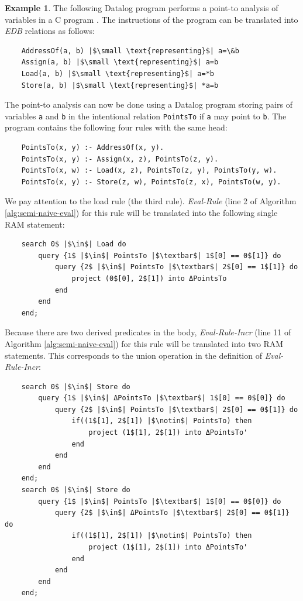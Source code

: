\documentclass[twoside,11pt,openright]{report}
\theoremstyle{definition}
\newtheorem{exmp}{Example}[chapter]
\begin{document}
\begin{exmp}
  The following Datalog program performs a point-to analysis of variables in a C program \cite{PGL-014}. The instructions of the program can be translated into \textit{EDB} relations as follows:
  \begin{verbatim}
    AddressOf(a, b) |$\small \text{representing}$| a=\&b
    Assign(a, b) |$\small \text{representing}$| a=b
    Load(a, b) |$\small \text{representing}$| a=*b
    Store(a, b) |$\small \text{representing}$| *a=b
  \end{verbatim}
  The point-to analysis can now be done using a Datalog program storing pairs of variables \texttt{a} and \texttt{b} in the intentional relation \texttt{PointsTo} if \texttt{a} may point to \texttt{b}. The program contains the following four rules with the same head:
  \begin{verbatim}
    PointsTo(x, y) :- AddressOf(x, y).
    PointsTo(x, y) :- Assign(x, z), PointsTo(z, y).
    PointsTo(x, w) :- Load(x, z), PointsTo(z, y), PointsTo(y, w).
    PointsTo(x, y) :- Store(z, w), PointsTo(z, x), PointsTo(w, y).
  \end{verbatim}
  We pay attention to the load rule (the third rule). \textit{Eval-Rule} (line 2 of Algorithm \ref{alg:semi-naive-eval}) for this rule will be translated into the following single RAM statement:
  \begin{verbatim}
    search 0$ |$\in$| Load do
        query {1$ |$\in$| PointsTo |$\textbar$| 1$[0] == 0$[1]} do
            query {2$ |$\in$| PointsTo |$\textbar$| 2$[0] == 1$[1]} do
                project (0$[0], 2$[1]) into ΔPointsTo
            end
        end
    end;
  \end{verbatim}
  Because there are two derived predicates in the body, \textit{Eval-Rule-Incr} (line 11 of Algorithm \ref{alg:semi-naive-eval}) for this rule will be translated into two RAM statements. This corresponds to the union operation in the definition of \textit{Eval-Rule-Incr}:
  \begin{verbatim}
    search 0$ |$\in$| Store do
        query {1$ |$\in$| ΔPointsTo |$\textbar$| 1$[0] == 0$[0]} do
            query {2$ |$\in$| PointsTo |$\textbar$| 2$[0] == 0$[1]} do
                if((1$[1], 2$[1]) |$\notin$| PointsTo) then
                    project (1$[1], 2$[1]) into ΔPointsTo'
                end
            end
        end
    end;
    search 0$ |$\in$| Store do
        query {1$ |$\in$| PointsTo |$\textbar$| 1$[0] == 0$[0]} do
            query {2$ |$\in$| ΔPointsTo |$\textbar$| 2$[0] == 0$[1]} do
                if((1$[1], 2$[1]) |$\notin$| PointsTo) then
                    project (1$[1], 2$[1]) into ΔPointsTo'
                end
            end
        end
    end;
  \end{verbatim}
\end{exmp}
\label{exmp:point-to}
\end{document}
